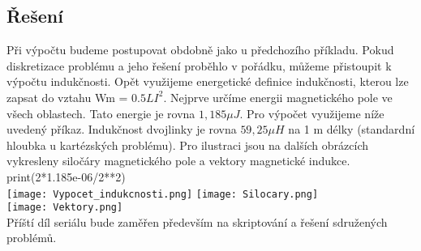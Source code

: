 \documentclass[a4paper, oneside]{article}
\begin{document}
\subsection{Řešení}
\indent Při výpočtu budeme postupovat obdobně jako u předchozího příkladu. Pokud diskretizace problému a jeho řešení proběhlo v pořádku, můžeme přistoupit k výpočtu indukčnosti. Opět využijeme energetické definice indukčnosti, kterou lze zapsat do vztahu Wm = $0.5 LI^2$. Nejprve určíme energii magnetického pole ve všech oblastech. Tato energie je rovna $1,185 \mu J$. Pro výpočet využijeme níže uvedený příkaz. Indukčnost dvojlinky je rovna $59,25 \mu H$ na 1 m délky (standardní hloubka u kartézských problému). Pro ilustraci jsou na dalších obrázcích vykresleny siločáry magnetického pole a vektory magnetické indukce.\\
print(2*1.185e-06/2**2)\\
\texttt{[image: Vypocet\_indukcnosti.png]}
\texttt{[image: Silocary.png]}\\
\texttt{[image: Vektory.png]}\\
Příští díl seriálu bude zaměřen především na skriptování a řešení sdružených problémů.\\
\end{document}
